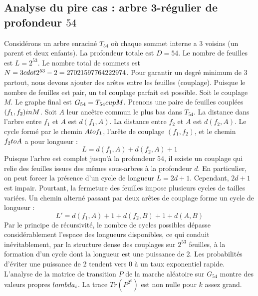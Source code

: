 \documentclass[12pt,a4paper]{article}
\begin{document}
\subsection{Analyse du pire cas : arbre 3-r\'egulier de profondeur $54$}
Consid\'erons un arbre enracin\'e $T_{54}$ o\`u chaque sommet interne a 3 voisins (un parent et deux enfants).
La profondeur totale est $D = 54$.
Le nombre de feuilles est $L = 2^{53}$.
Le nombre total de sommets est $N = 3 \\cdot 2^{53} - 2 = 27021597764222974$.
Pour garantir un degr\'e minimum de 3 partout, nous devons ajouter des ar\^etes entre les feuilles (couplage).
Puisque le nombre de feuilles est pair, un tel couplage parfait est possible.
Soit le couplage $M$. Le graphe final est $G_{54} = T_{54} \\cup M$.
Prenons une paire de feuilles coupl\'ees $(f_1, f_2) \\in M$.
Soit $A$ leur anc\^etre commun le plus bas dans $T_{54}$.
La distance dans l'arbre entre $f_1$ et $A$ est $d(f_1, A)$.
La distance entre $f_2$ et $A$ est $d(f_2, A)$.
Le cycle form\'e par le chemin $A \\to f_1$, l'ar\^ete de couplage $(f_1, f_2)$, et le chemin $f_2 \\to A$ a pour longueur :
$$ L = d(f_1, A) + d(f_2, A) + 1 $$
Puisque l'arbre est complet jusqu'\`a la profondeur $54$, il existe un couplage qui relie des feuilles issues des m\^emes sous-arbres \`a la profondeur $d$.
En particulier, on peut forcer la pr\'esence d'un cycle de longueur $L = 2d + 1$. Cependant, $2d+1$ est impair.
Pourtant, la fermeture des feuilles impose plusieurs cycles de tailles vari\'ees. Un chemin altern\'e passant par deux ar\^etes de couplage forme un cycle de longueur :
$$ L' = d(f_1, A) + 1 + d(f_2, B) + 1 + d(A, B) $$
Par le principe de r\'ecursivit\'e, le nombre de cycles possibles d\'epasse consid\'erablement l'espace des longueurs disponibles, ce qui conduit in\'evitablement, par la structure dense des couplages sur $2^{53}$ feuilles, \`a la formation d'un cycle dont la longueur est une puissance de 2. Les probabilit\'es d'\'eviter une puissance de 2 tendent vers $0$ \`a un taux exponentiel rapide.
L'analyse de la matrice de transition $P$ de la marche al\'eatoire sur $G_{54}$ montre des valeurs propres $\\lambda_i$. La trace $Tr(P^{2^k})$ est non nulle pour $k$ assez grand.
\end{document}
